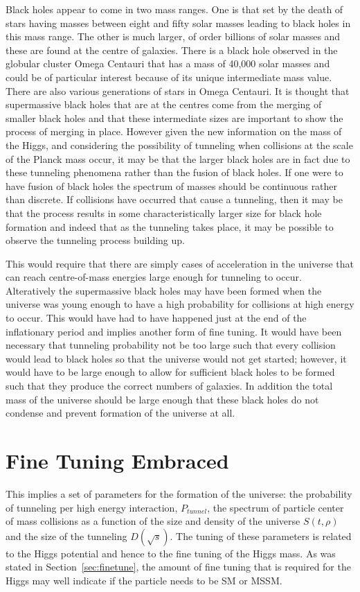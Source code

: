 \documentclass[a4paper]{article}
\begin{document}
Black holes appear to come in two mass ranges.  One is that set by the death of stars having masses between
eight and fifty solar masses leading to black holes in this mass range.  The other is much larger, of order
billions of solar masses and these are found at the centre of galaxies. There is a black hole observed
in the globular cluster
 Omega Centauri that has a mass of 40,000 solar masses and could be of particular interest because of its
unique intermediate mass value.  There are also various generations of stars in Omega Centauri. It is thought
that supermassive black holes that are at the centres come from the merging of smaller black holes and that
these intermediate sizes are important to show the process of merging in place. However given the new information
on the mass of the Higgs, and considering the possibility of tunneling when collisions at the scale of the 
Planck mass occur, it may be that the larger black holes are in fact due to these tunneling phenomena rather than
the fusion of black holes. If one were to have fusion of black holes the spectrum of masses should be continuous
rather than discrete.  If collisions have occurred that cause a tunneling, then it may be that the process 
results in some characteristically larger size for black hole formation and indeed that as the tunneling
takes place, it may be possible to observe the tunneling process building up. 

This would require that there are simply cases of acceleration in the universe that can reach centre-of-mass
energies large enough for tunneling to occur. Alteratively the supermassive black holes may have been formed 
when the universe was young enough to have a high probability for collisions at high energy to occur.  This 
would have had to have happened just at the end of the inflationary period and implies another form of fine
tuning. It would have been necessary that tunneling probability not be too large such that every collision
would lead to black holes so that the universe would not get started; however, it would have to be large enough
to allow for sufficient black holes to be formed such that they produce the correct numbers of galaxies.
In addition the total mass of the universe should be large enough that these black holes do not condense and 
prevent formation of the universe at all.

\section{Fine Tuning Embraced}
\label{sec:ftembrace}
This implies a set of parameters for the formation of the universe: the probability of tunneling per 
high energy interaction, $P_{tunnel}$, the spectrum of particle center of mass collisions as a function of
the size and density of the universe $S\left(t,\rho\right)$ and the size of the tunneling $D\left(\sqrt{s}\right)$.
The tuning of these parameters is related to the Higgs potential and hence to the fine tuning of the Higgs mass.
As was stated in Section~\ref{sec:finetune}, the amount of fine tuning that is required for the Higgs may well
indicate if the particle needs to be SM or MSSM. 
\end{document}

